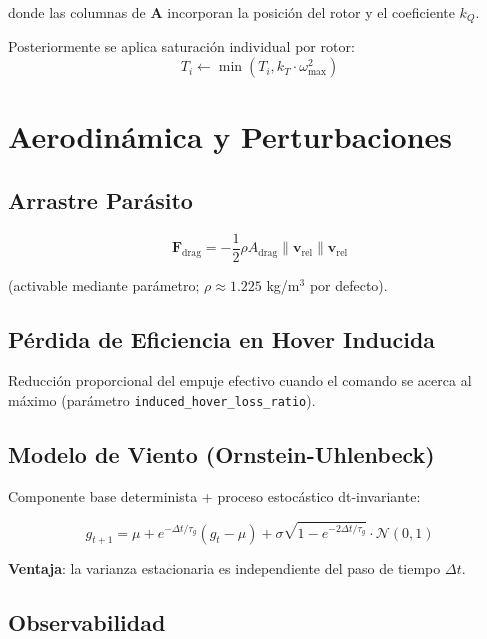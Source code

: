 \documentclass[12pt,a4paper]{article}
\begin{document}
donde las columnas de $\mathbf{A}$ incorporan la posición del rotor y el coeficiente $k_Q$.

Posteriormente se aplica saturación individual por rotor:
\begin{equation}
    T_i \leftarrow \min(T_i, k_T \cdot \omega_{\max}^2)
\end{equation}

\section{Aerodinámica y Perturbaciones}

\subsection{Arrastre Parásito}

\begin{equation}
    \mathbf{F}_{\text{drag}} = -\frac{1}{2} \rho A_{\text{drag}} \|\mathbf{v}_{\text{rel}}\| \mathbf{v}_{\text{rel}}
\end{equation}

(activable mediante parámetro; $\rho \approx 1.225$ kg/m$^3$ por defecto).

\subsection{Pérdida de Eficiencia en Hover Inducida}

Reducción proporcional del empuje efectivo cuando el comando se acerca al máximo (parámetro \texttt{induced\_hover\_loss\_ratio}).

\subsection{Modelo de Viento (Ornstein-Uhlenbeck)}

Componente base determinista + proceso estocástico dt-invariante:

\begin{equation}
    g_{t+1} = \mu + e^{-\Delta t / \tau_g} (g_t - \mu) + \sigma \sqrt{1 - e^{-2\Delta t / \tau_g}} \cdot \mathcal{N}(0,1)
\end{equation}

\textbf{Ventaja}: la varianza estacionaria es independiente del paso de tiempo $\Delta t$.

\subsection{Observabilidad}
\end{document}
